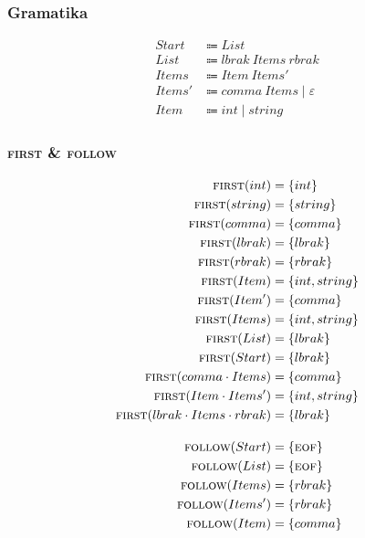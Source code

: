 \documentclass{report}
\newcommand{\Null}{\varepsilon}
\newcommand{\Seq}{\cdot}
\newcommand{\Spc}{\ }
\newcommand{\Union}{\mathrel{|}}
\newcommand{\FIRST}{\textsc{first}}
\newcommand{\FOLLOW}{\textsc{follow}}
\newcommand{\EOF}{\textsc{eof}}
\newcommand{\Arrow}{\Coloneq}
\newcommand{\NT}[1]{{#1}}
\newcommand{\T}[1]{{#1}}
\begin{document}
    \subsubsection*{Gramatika}
    \begin{equation*}
      \begin{aligned}
        \NT{Start} &\Arrow \NT{List}\\
        \NT{List} &\Arrow \T{lbrak} \Spc \NT{Items} \Spc \T{rbrak}\\
        \NT{Items} &\Arrow \NT{Item} \Spc \NT{Items'}\\
        \NT{Items'} &\Arrow \T{comma} \Spc \NT{Items} \Union \Null\\
        \NT{Item} &\Arrow \T{int} \Union \T{string}
      \end{aligned}
    \end{equation*}

    \subsubsection*{{\FIRST} \& {\FOLLOW}}
    \begin{equation*}
      \begin{aligned}
        \FIRST(\T{int}) &= \{\T{int}\}\\
        \FIRST(\T{string}) &= \{\T{string}\}\\
        \FIRST(\T{comma}) &= \{\T{comma}\}\\
        \FIRST(\T{lbrak}) &= \{\T{lbrak}\}\\
        \FIRST(\T{rbrak}) &= \{\T{rbrak}\}\\
        \FIRST(\NT{Item}) &= \{\T{int}, \T{string}\}\\
        \FIRST(\NT{Item'}) &= \{\T{comma}\}\\
        \FIRST(\NT{Items}) &= \{\T{int}, \T{string}\}\\
        \FIRST(\NT{List}) &= \{\T{lbrak}\}\\
        \FIRST(\NT{Start}) &= \{\T{lbrak}\}\\
        \FIRST(\T{comma} \Seq \NT{Items}) &= \{\T{comma}\}\\
        \FIRST(\NT{Item} \Seq \NT{Items'}) &= \{\T{int}, \T{string}\}\\
        \FIRST(\T{lbrak} \Seq \NT{Items} \Seq \T{rbrak}) &= \{\T{lbrak}\}\\[1em]
        \FOLLOW(\NT{Start}) &= \{\EOF\}\\
        \FOLLOW(\NT{List}) &= \{\EOF\}\\
        \FOLLOW(\NT{Items}) &= \{\T{rbrak}\}\\
        \FOLLOW(\NT{Items'}) &= \{\T{rbrak}\}\\
        \FOLLOW(\NT{Item}) &= \{\T{comma}\}
      \end{aligned}
    \end{equation*}
\end{document}

